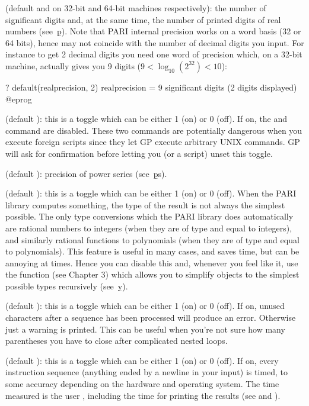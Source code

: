  (default  and  on 32-bit and 64-bit machines respectively): the number of significant digits and, at the same
time, the number of printed digits of real numbers (see~\b{p}). Note that
PARI internal precision works on a word basis (32 or 64 bits), hence may not
coincide with the number of decimal digits you input. For instance to get 2
decimal digits you need one word of precision which, on a 32-bit machine,
actually gives you 9 digits ($9 < \log_{10}(2^{32}) < 10$):

\bprog
? default(realprecision, 2)
      realprecision = 9 significant digits (2 digits displayed)
@eprog

 (default ): this is a toggle which can be either 1
(on) or 0 (off). If on, the  and  command are
disabled. These two commands are potentially dangerous when you execute
foreign scripts since they let GP execute arbitrary UNIX commands. GP will
ask for confirmation before letting you (or a script) unset this toggle.

 (default ): precision of power series
(see~\b{ps}).

 (default ): this is a toggle which can be either
1 (on) or 0 (off). When the PARI library computes something, the type of the
result is not always the simplest possible. The only type conversions which
the PARI library does automatically are rational numbers to integers (when
they are of type  and equal to integers), and similarly rational
functions to polynomials (when they are of type  and equal to
polynomials). This feature is useful in many cases, and saves time, but can
be annoying at times. Hence you can disable this and, whenever you feel like
it, use the function  (see Chapter 3) which allows you to
simplify objects to the simplest possible types recursively (see~\b{y}).

 (default ): this is a toggle which can be
either 1 (on) or 0 (off). If on, unused characters after a sequence has been
processed will produce an error. Otherwise just a warning is printed. This
can be useful when you're not sure how many parentheses you have to close after
complicated nested loops.

 (default ): this is a toggle which can be either 1
(on) or 0 (off). If on, every instruction sequence (anything ended by a
newline in your input) is timed, to some accuracy depending on the hardware
and operating system. The time measured is the user ,
 including the time for printing the results (see \kbd{\#} and
\kbd{\#\#}).

